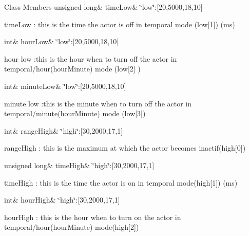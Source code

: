 \begin{DoxyFields}{Class Members}
\mbox{\label{class_cool_board_actor_a314c53c146e8c7b12c025323a34fbb9a}} 
unsigned long&
timeLow&
\char`\"{}low\char`\"{}\+:\mbox{[}20,5000,18,10\mbox{]}

time\+Low \+: this is the time the actor is off in temporal mode (low\mbox{[}1\mbox{]}) (ms) \\
\hline

\mbox{\label{class_cool_board_actor_ae7034bf95b36f1392f9de076fa0c8c0f}} 
int&
hourLow&
\char`\"{}low\char`\"{}\+:\mbox{[}20,5000,18,10\mbox{]}

hour low \+:this is the hour when to turn off the actor in temporal/hour(hour\+Minute) mode (low\mbox{[}2\mbox{]} ) \\
\hline

\mbox{\label{class_cool_board_actor_acbcc2902331fd9d757cd475eb403bdd9}} 
int&
minuteLow&
\char`\"{}low\char`\"{}\+:\mbox{[}20,5000,18,10\mbox{]}

minute low \+:this is the minute when to turn off the actor in temporal/minute(hour\+Minute) mode (low\mbox{[}3\mbox{]}) \\
\hline

\mbox{\label{class_cool_board_actor_a6e5cd6c5cd44e2decfd8d4df1853f8e3}} 
int&
rangeHigh&
\char`\"{}high\char`\"{}\+:\mbox{[}30,2000,17,1\mbox{]}

range\+High \+: this is the maximum at which the actor becomes inactif(high\mbox{[}0\mbox{]}) \\
\hline

\mbox{\label{class_cool_board_actor_a54cd4976b56aeaa6274fe0576aaebb0f}} 
unsigned long&
timeHigh&
\char`\"{}high\char`\"{}\+:\mbox{[}30,2000,17,1\mbox{]}

time\+High \+: this is the time the actor is on in temporal mode(high\mbox{[}1\mbox{]}) (ms) \\
\hline

\mbox{\label{class_cool_board_actor_acd1af3ac2382258a5b05497d814adc01}} 
int&
hourHigh&
\char`\"{}high\char`\"{}\+:\mbox{[}30,2000,17,1\mbox{]}

hour\+High \+: this is the hour when to turn on the actor in temporal/hour(hour\+Minute) mode(high\mbox{[}2\mbox{]}) \\
\hline


\end{DoxyFields}
